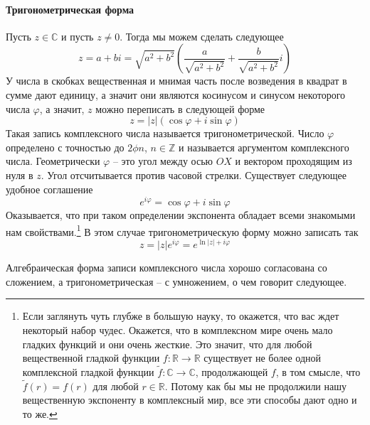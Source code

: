 \paragraph{Тригонометрическая форма} Пусть $z\in\mathbb C$ и пусть $z\neq 0$. Тогда мы можем сделать следующее
\[
z = a + bi = \sqrt{a^2 + b^2}\left(\frac{a}{\sqrt{a^2 + b^2}} + \frac{b}{\sqrt{a^2 + b^2}}i\right)
\]
У числа в скобках вещественная и мнимая часть после возведения в квадрат в сумме дают единицу, а значит они являются косинусом и синусом некоторого числа $\varphi$, а значит, $z$ можно переписать в следующей форме
\[
z = |z| (\cos \varphi + i\sin\varphi)
\]
Такая запись комплексного числа называется тригонометрической. Число $\varphi$ определено с точностью до $2\phi n$, $n\in\mathbb Z$ и называется аргументом комплексного числа. Геометрически $\varphi$ -- это угол между осью $OX$ и вектором проходящим из нуля в $z$. Угол отсчитывается против часовой стрелки. Существует следующее удобное соглашение
\[
e^{i\varphi} = \cos \varphi + i \sin \varphi
\]
Оказывается, что при таком определении экспонента обладает всеми знакомыми нам свойствами.\footnote{Если заглянуть чуть глубже в большую науку, то окажется, что вас ждет некоторый набор чудес. Окажется, что в комплексном мире очень мало гладких функций и они очень жесткие. Это значит, что для любой вещественной гладкой функции $f\colon \mathbb R\to \mathbb R$ существует не более одной комплексной гладкой функции $\tilde f\colon \mathbb C\to \mathbb C$, продолжающей $f$, в том смысле, что $\tilde f(r) = f(r)$ для любой $r\in \mathbb R$. Потому как бы мы не продолжили нашу вещественную экспоненту в комплексный мир, все эти способы дают одно и то же.} В этом случае тригонометрическую форму можно записать так
\[
z = |z| e^{i\varphi} = e^{\ln |z| + i\varphi}
\]

Алгебраическая форма записи комплексного числа хорошо согласована со сложением, а тригонометрическая -- с умножением, о чем говорит следующее.

